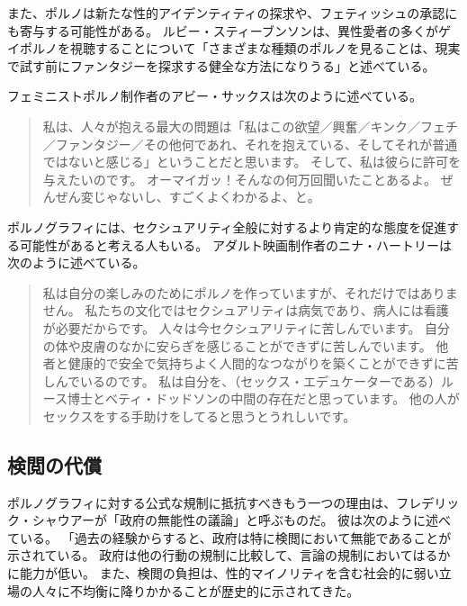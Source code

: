 \documentclass[paper=a4,book,openany]{jlreq}
\begin{document}
また、ポルノは新たな性的アイデンティティの探求や、フェティッシュの承認にも寄与する可能性がある。
ルビー・スティーブンソンは、異性愛者の多くがゲイポルノを視聴することについて「さまざまな種類のポルノを見ることは、現実で試す前にファンタジーを探求する健全な方法になりうる」と述べている\citep{bloodworth18:_this_is_why_straig_men}。

フェミニストポルノ制作者のアビー・サックスは次のように述べている。

\begin{quote}
私は、人々が抱える最大の問題は「私はこの欲望／興奮／キンク／フェチ／ファンタジー／その他何であれ、それを抱えている、そしてそれが普通ではないと感じる」ということだと思います。
そして、私は彼らに許可を与えたいのです。
オーマイガッ！そんなの何万回聞いたことあるよ。
ぜんぜん変じゃないし、すごくよくわかるよ、と。
\citep{sachs12:_inter_femin_pornog}
\end{quote}

ポルノグラフィには、セクシュアリティ全般に対するより肯定的な態度を促進する可能性があると考える人もいる。
アダルト映画制作者のニナ・ハートリーは次のように述べている。

\begin{quote}
私は自分の楽しみのためにポルノを作っていますが、それだけではありません。
私たちの文化ではセクシュアリティは病気であり、病人には看護が必要だからです。
人々は今セクシュアリティに苦しんでいます。
自分の体や皮膚のなかに安らぎを感じることができずに苦しんでいます。
他者と健康的で安全で気持ちよく人間的なつながりを築くことができずに苦しんでいるのです。
私は自分を、（セックス・エデュケーターである）ルース博士とベティ・ドッドソンの中間の存在だと思っています。
他の人がセックスをする手助けをしてると思うとうれしいです。
\citep{wischhover15:_why_im_still_doing_porn}
\end{quote}

\subsection{検閲の代償}

ポルノグラフィに対する公式な規制に抵抗すべきもう一つの理由は、フレデリック・シャウアーが「政府の無能性の議論」と呼ぶものだ。
彼は次のように述べている。
「過去の経験からすると、政府は特に検閲において無能であることが示されている。
政府は他の行動の規制に比較して、言論の規制においてはるかに能力が低い\citep[p.82]{schauer82:_free_speec}。
また、検閲の負担は、性的マイノリティを含む社会的に弱い立場の人々に不均衡に降りかかることが歴史的に示されてきた。
\end{document}
